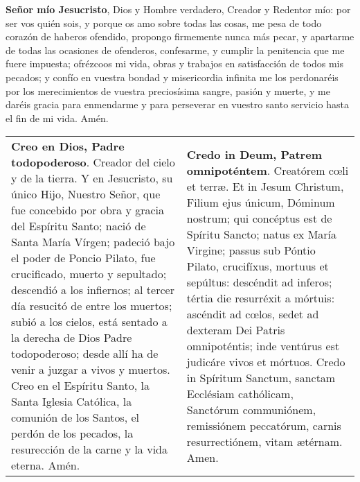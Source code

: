 \documentclass[./rosary.tex]{subfiles}
\begin{document}
\label{contrition}
\textbf{Señor mío Jesucristo}, Dios y Hombre verdadero, Creador y Redentor mío: por ser vos quién sois, y porque os amo sobre todas las cosas,
me pesa de todo corazón de haberos ofendido, propongo firmemente nunca más pecar, y apartarme de todas las ocasiones de ofenderos,
confesarme, y cumplir la penitencia que me fuere impuesta; ofrézcoos mi vida, obras y trabajos en satisfacción de todos mis pecados;
y confío en vuestra bondad y misericordia infinita me los perdonaréis por los merecimientos de vuestra preciosísima sangre, pasión y muerte,
y me daréis gracia para enmendarme y para perseverar en vuestro santo servicio hasta el fin de mi vida. Amén.

\label{creed}
\begin{longtable} { p{} p{} }
    \textbf{Creo en Dios, Padre todopoderoso}. Creador del cielo y de la tierra. Y en Jesucristo, su único Hijo, Nuestro Señor,
    que fue concebido por obra y gracia del Espíritu Santo; nació de Santa María Vírgen; padeció bajo el poder de Poncio Pilato,
    fue crucificado, muerto y sepultado; descendió a los infiernos; al tercer día resucitó de entre los muertos; subió a los cielos,
    está sentado a la derecha de Dios Padre todopoderoso; desde allí ha de venir a juzgar a vivos y muertos.
    Creo en el Espíritu Santo, la Santa Iglesia Católica, la comunión de los Santos, el perdón de los pecados,
    la resurección de la carne y la vida eterna. Amén.
     &
    \textbf{Credo in Deum, Patrem omnipoténtem}. Creatórem cœli et terræ. Et in Jesum Christum, Filium ejus únicum, Dóminum nostrum;
    qui concéptus est de Spíritu Sancto; natus ex María Virgine; passus sub Póntio Pilato, crucifíxus, mortuus et sepúltus:
    descéndit ad inferos; tértia die resurréxit a mórtuis: ascéndit ad cœlos, sedet ad dexteram Dei Patris omnipoténtis;
    inde ventúrus est judicáre vivos et mórtuos. Credo in Spíritum Sanctum, sanctam Ecclésiam cathólicam, Sanctórum communiónem,
    remissiónem peccatórum, carnis resurrectiónem, vitam ætérnam. Amen.
\end{longtable}
\end{document}
